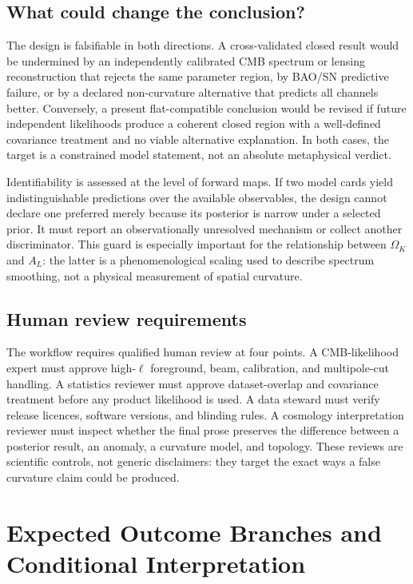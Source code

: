 \documentclass[conference]{IEEEtran}
\newcommand{\ok}{\ensuremath{\Omega_K}}
\begin{document}
\subsection{What could change the conclusion?}

The design is falsifiable in both directions. A cross-validated closed result would be undermined by an independently calibrated CMB spectrum or lensing reconstruction that rejects the same parameter region, by BAO/SN predictive failure, or by a declared non-curvature alternative that predicts all channels better. Conversely, a present flat-compatible conclusion would be revised if future independent likelihoods produce a coherent closed region with a well-defined covariance treatment and no viable alternative explanation. In both cases, the target is a constrained model statement, not an absolute metaphysical verdict.

Identifiability is assessed at the level of forward maps. If two model cards yield indistinguishable predictions over the available observables, the design cannot declare one preferred merely because its posterior is narrow under a selected prior. It must report an observationally unresolved mechanism or collect another discriminator. This guard is especially important for the relationship between $\ok$ and $A_L$: the latter is a phenomenological scaling used to describe spectrum smoothing, not a physical measurement of spatial curvature.

\subsection{Human review requirements}

The workflow requires qualified human review at four points. A CMB-likelihood expert must approve high-$\ell$ foreground, beam, calibration, and multipole-cut handling. A statistics reviewer must approve dataset-overlap and covariance treatment before any product likelihood is used. A data steward must verify release licences, software versions, and blinding rules. A cosmology interpretation reviewer must inspect whether the final prose preserves the difference between a posterior result, an anomaly, a curvature model, and topology. These reviews are scientific controls, not generic disclaimers: they target the exact ways a false curvature claim could be produced.

\section{Expected Outcome Branches and Conditional Interpretation}
\end{document}
